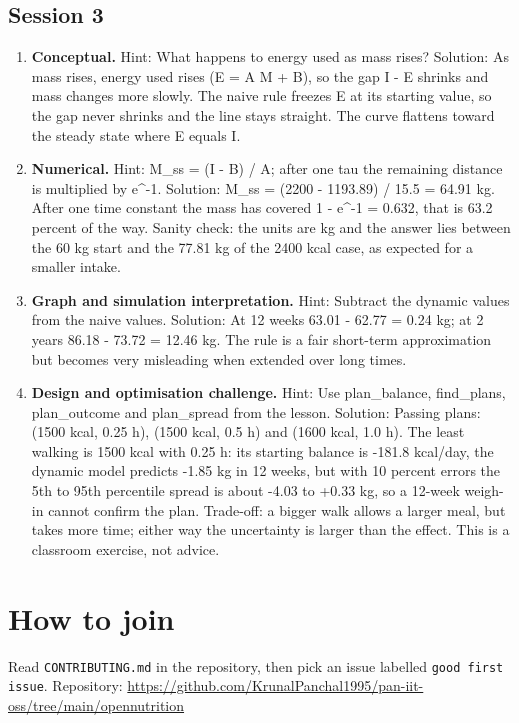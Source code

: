 \documentclass[11pt,a4paper]{article}
\begin{document}
\subsection*{Session 3}
\begin{enumerate}[nosep]
\item \textbf{Conceptual.} Hint: What happens to energy used as mass rises? Solution: As mass rises, energy used rises (E = A M + B), so the gap I - E shrinks and mass changes more slowly. The naive rule freezes E at its starting value, so the gap never shrinks and the line stays straight. The curve flattens toward the steady state where E equals I.
\item \textbf{Numerical.} Hint: M\_ss = (I - B) / A; after one tau the remaining distance is multiplied by e\textasciicircum{}-1. Solution: M\_ss = (2200 - 1193.89) / 15.5 = 64.91 kg. After one time constant the mass has covered 1 - e\textasciicircum{}-1 = 0.632, that is 63.2 percent of the way. Sanity check: the units are kg and the answer lies between the 60 kg start and the 77.81 kg of the 2400 kcal case, as expected for a smaller intake.
\item \textbf{Graph and simulation interpretation.} Hint: Subtract the dynamic values from the naive values. Solution: At 12 weeks 63.01 - 62.77 = 0.24 kg; at 2 years 86.18 - 73.72 = 12.46 kg. The rule is a fair short-term approximation but becomes very misleading when extended over long times.
\item \textbf{Design and optimisation challenge.} Hint: Use plan\_balance, find\_plans, plan\_outcome and plan\_spread from the lesson. Solution: Passing plans: (1500 kcal, 0.25 h), (1500 kcal, 0.5 h) and (1600 kcal, 1.0 h). The least walking is 1500 kcal with 0.25 h: its starting balance is -181.8 kcal/day, the dynamic model predicts -1.85 kg in 12 weeks, but with 10 percent errors the 5th to 95th percentile spread is about -4.03 to +0.33 kg, so a 12-week weigh-in cannot confirm the plan. Trade-off: a bigger walk allows a larger meal, but takes more time; either way the uncertainty is larger than the effect. This is a classroom exercise, not advice.
\end{enumerate}

\section{How to join}
Read \texttt{CONTRIBUTING.md} in the repository, then pick an issue labelled \texttt{good first issue}. Repository: \url{https://github.com/KrunalPanchal1995/pan-iit-oss/tree/main/opennutrition}
\end{document}
